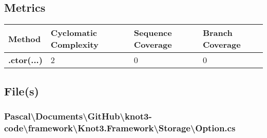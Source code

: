 \documentclass[a4paper,10pt]{article}
\begin{document}
\subsection{Metrics}
\begin{longtable}[l]{|l|l|l|l|}
\hline
\textbf{Method} & \textbf{Cyclomatic Complexity} & \textbf{Sequence Coverage} & \textbf{Branch Coverage}\\
\hline
\textbf{.ctor(...)} & 2 & 0 & 0\\
\hline
\end{longtable}
\subsection{File(s)}
\subsubsection{Pascal\textbackslash Documents\textbackslash GitHub\textbackslash knot3-code\textbackslash framework\textbackslash Knot3.Framework\textbackslash Storage\textbackslash Option.cs}
\end{document}
